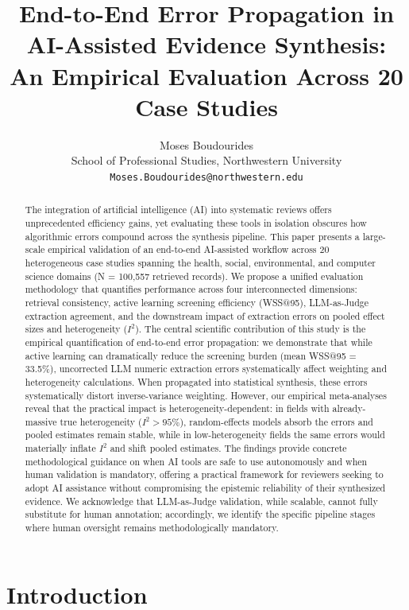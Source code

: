 \documentclass[12pt]{article}
\title{End-to-End Error Propagation in AI-Assisted Evidence Synthesis: An Empirical Evaluation Across 20 Case Studies}
\author{Moses Boudourides\\
\small School of Professional Studies, Northwestern University\\
\small \texttt{Moses.Boudourides@northwestern.edu}}
\date{}
\begin{document}
\maketitle

\begin{abstract}
The integration of artificial intelligence (AI) into systematic reviews offers unprecedented efficiency gains, yet evaluating these tools in isolation obscures how algorithmic errors compound across the synthesis pipeline. This paper presents a large-scale empirical validation of an end-to-end AI-assisted workflow across 20 heterogeneous case studies spanning the health, social, environmental, and computer science domains (N = 100,557 retrieved records). We propose a unified evaluation methodology that quantifies performance across four interconnected dimensions: retrieval consistency, active learning screening efficiency (WSS@95), LLM-as-Judge extraction agreement, and the downstream impact of extraction errors on pooled effect sizes and heterogeneity ($I^2$). The central scientific contribution of this study is the empirical quantification of end-to-end error propagation: we demonstrate that while active learning can dramatically reduce the screening burden (mean WSS@95 = 33.5\%), uncorrected LLM numeric extraction errors systematically affect weighting and heterogeneity calculations. When propagated into statistical synthesis, these errors systematically distort inverse-variance weighting. However, our empirical meta-analyses reveal that the practical impact is heterogeneity-dependent: in fields with already-massive true heterogeneity ($I^2 > 95\%$), random-effects models absorb the errors and pooled estimates remain stable, while in low-heterogeneity fields the same errors would materially inflate $I^2$ and shift pooled estimates. The findings provide concrete methodological guidance on when AI tools are safe to use autonomously and when human validation is mandatory, offering a practical framework for reviewers seeking to adopt AI assistance without compromising the epistemic reliability of their synthesized evidence. We acknowledge that LLM-as-Judge validation, while scalable, cannot fully substitute for human annotation; accordingly, we identify the specific pipeline stages where human oversight remains methodologically mandatory.
\end{abstract}

\section{Introduction}
\end{document}
